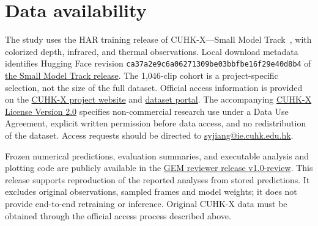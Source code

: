 \section*{Data availability}
The study uses the HAR training release of CUHK-X---Small Model Track~\cite{jiang2026cuhkx}, with colorized depth, infrared, and thermal observations. Local download metadata identifies Hugging Face revision \texttt{ca37a2e9c6a06271309be03bbfbe16f29e40d8b4} of \href{https://huggingface.co/datasets/Kevin-Pal/CUHK-X_Small_Model_Track}{the Small Model Track release}. The 1,046-clip cohort is a project-specific selection, not the size of the full dataset. Official access information is provided on the \href{https://openaiotlab.github.io/CUHK-X/}{CUHK-X project website} and \href{https://aiot-public-dataset-cuhk-x.cuhkaiot.com/}{dataset portal}. The accompanying \href{https://huggingface.co/datasets/Kevin-Pal/CUHK-X_Small_Model_Track/blob/main/LICENSE}{CUHK-X License Version 2.0} specifies non-commercial research use under a Data Use Agreement, explicit written permission before data access, and no redistribution of the dataset. Access requests should be directed to \href{mailto:syjiang@ie.cuhk.edu.hk}{syjiang@ie.cuhk.edu.hk}.

Frozen numerical predictions, evaluation summaries, and executable analysis and plotting code are publicly available in the \href{https://github.com/xxxmaos/GEM-CUHK-X-Data-Availability/releases/tag/v1.0-review}{GEM reviewer release v1.0-review}. This release supports reproduction of the reported analyses from stored predictions. It excludes original observations, sampled frames and model weights; it does not provide end-to-end retraining or inference. Original CUHK-X data must be obtained through the official access process described above.
